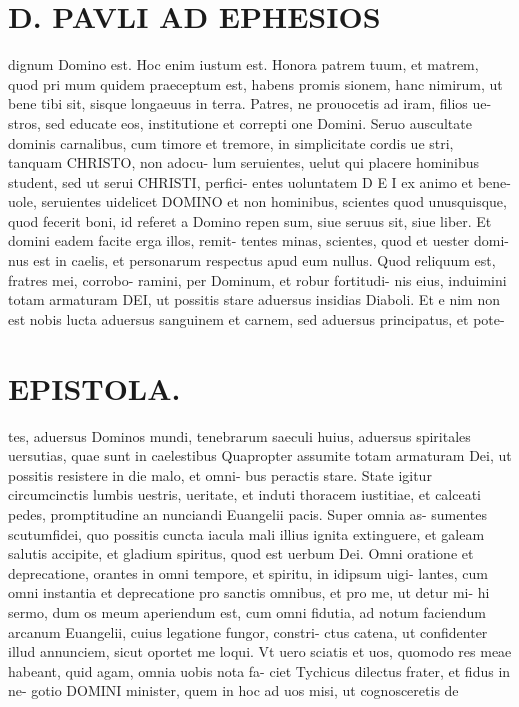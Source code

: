 \documentclass{article}
\begin{document}
\begin{pages}
\section*{D. PAVLI AD EPHESIOS }
\marginpar{[ p.2.  ]}
\marginpar{[ p.3.  ]}
\marginpar{[ p.4.  ]}
\marginpar{[ p.5.  ]}\pstart dignum Domino est. Hoc enim iustum est. Honora patrem tuum, et matrem, quod pri mum quidem praeceptum est, habens promis sionem, hanc nimirum, ut bene tibi sit, sisque longaeuus in terra.  \pend\pstart Patres, ne prouocetis ad iram, filios ue- stros, sed educate eos, institutione et correpti one Domini.  \pend\pstart Seruo auscultate dominis carnalibus, cum timore et tremore, in simplicitate cordis ue stri, tanquam CHRISTO, non adocu- lum seruientes, uelut qui placere hominibus student, sed ut serui CHRISTI, perfici- entes uoluntatem D E I ex animo et bene- uole, seruientes uidelicet DOMINO et non hominibus, scientes quod unusquisque, quod fecerit boni, id referet a Domino repen sum, siue seruus sit, siue liber.  \pend\pstart Et domini eadem facite erga illos, remit- tentes minas, scientes, quod et uester domi- nus est in caelis, et personarum respectus apud eum nullus.  \pend\pstart Quod reliquum est, fratres mei, corrobo- ramini, per Dominum, et robur fortitudi- nis eius, induimini totam armaturam DEI, ut possitis stare aduersus insidias Diaboli. Et e nim non est nobis lucta aduersus sanguinem et carnem, sed aduersus principatus, et pote-  \pend
\section*{EPISTOLA.  }
\marginpar{[ p.16 ]}
\marginpar{[ p.6.  ]}
\marginpar{[ p.7.  ]}
\marginpar{[ p.8.  ]}\pstart tes, aduersus Dominos mundi, tenebrarum saeculi huius, aduersus spiritales uersutias, quae sunt in caelestibus  \pend\pstart Quapropter assumite totam armaturam Dei, ut possitis resistere in die malo, et omni- bus peractis stare. State igitur circumcinctis lumbis uestris, ueritate, et induti thoracem iustitiae, et calceati pedes, promptitudine an nunciandi Euangelii pacis. Super omnia as- sumentes scutumfidei, quo possitis cuncta iacula mali illius ignita extinguere, et galeam salutis accipite, et gladium spiritus, quod est uerbum Dei.  \pend\pstart Omni oratione et deprecatione, orantes in omni tempore, et spiritu, in idipsum uigi- lantes, cum omni instantia et deprecatione pro sanctis omnibus, et pro me, ut detur mi- hi sermo, dum os meum aperiendum est, cum omni fidutia, ad notum faciendum arcanum Euangelii, cuius legatione fungor, constri- ctus catena, ut confidenter illud annunciem, sicut oportet me loqui.  \pend\pstart Vt uero sciatis et uos, quomodo res meae habeant, quid agam, omnia uobis nota fa- ciet Tychicus dilectus frater, et fidus in ne- gotio DOMINI minister, quem in hoc ad uos misi, ut cognosceretis de  \pend

\end{pages}
\end{document}
